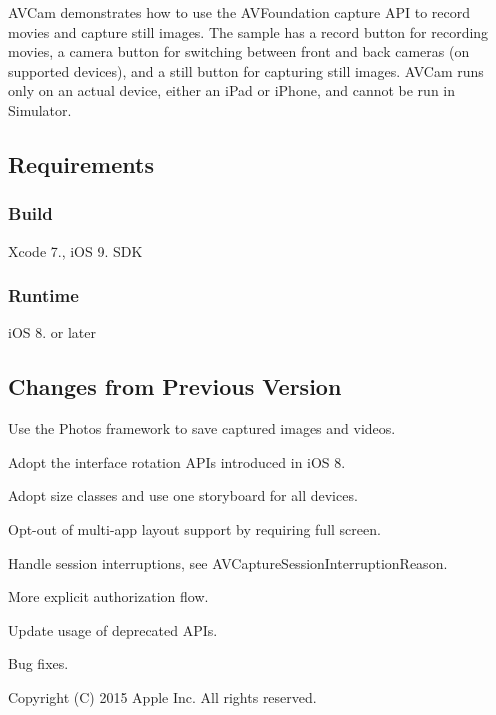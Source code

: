 A\+V\+Cam demonstrates how to use the A\+V\+Foundation capture A\+PI to record movies and capture still images. The sample has a record button for recording movies, a camera button for switching between front and back cameras (on supported devices), and a still button for capturing still images. A\+V\+Cam runs only on an actual device, either an i\+Pad or i\+Phone, and cannot be run in Simulator.

\subsection*{Requirements}

\subsubsection*{Build}

Xcode 7., i\+OS 9. S\+DK

\subsubsection*{Runtime}

i\+OS 8. or later

\subsection*{Changes from Previous Version}


\begin{DoxyItemize}
\item Use the Photos framework to save captured images and videos.
\item Adopt the interface rotation A\+P\+Is introduced in i\+OS 8.
\item Adopt size classes and use one storyboard for all devices.
\item Opt-\/out of multi-\/app layout support by requiring full screen.
\item Handle session interruptions, see A\+V\+Capture\+Session\+Interruption\+Reason.
\item More explicit authorization flow.
\item Update usage of deprecated A\+P\+Is.
\item Bug fixes.
\end{DoxyItemize}

Copyright (C) 2015 Apple Inc. All rights reserved. 